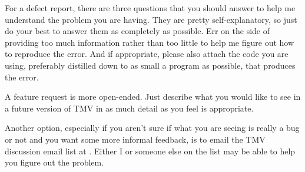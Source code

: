 For a defect report, there are three questions that you should answer to help me understand the problem you are having.  They are pretty self-explanatory, so just do your best to answer them as completely as possible.  Err on the side of providing too much information rather than too little to help me figure out how to reproduce the error.  And if appropriate, please also attach the code you are using, preferably distilled down to as small a program as possible, that produces the error.

A feature request is more open-ended.  Just describe what you would like to see in a future version of TMV in as much detail as you feel is appropriate.

Another option, especially if you aren't sure if what you are seeing is really a bug or not and you want some more informal feedback, is to email the TMV discussion email list at \mygroup.  Either I or someone else on the list may be able to help you figure out the problem.

